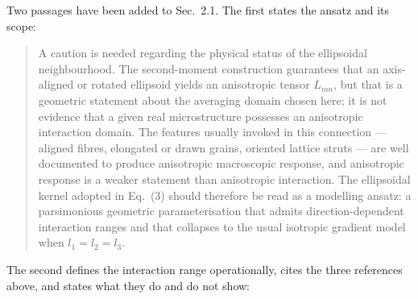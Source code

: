 \documentclass[12pt,a4paper]{article}
\begin{document}
Two passages have been added to Sec.~2.1. The first states the ansatz and its scope:

\begin{quote}\small
A caution is needed regarding the physical status of the
ellipsoidal neighbourhood. The second-moment construction guarantees
that an axis-aligned or rotated ellipsoid yields an anisotropic tensor
$L_{mn}$, but that is a geometric statement about the averaging domain
chosen here; it is not evidence that a given real microstructure
possesses an anisotropic interaction domain. The features usually
invoked in this connection --- aligned fibres, elongated or drawn
grains, oriented lattice struts --- are well documented to produce
anisotropic macroscopic response, and anisotropic response is a weaker
statement than anisotropic interaction. The ellipsoidal kernel adopted
in Eq.~(3) should therefore be read as a
modelling ansatz: a parsimonious geometric parameterisation that admits
direction-dependent interaction ranges and that collapses to the usual
isotropic gradient model when $l_1=l_2=l_3$.
\end{quote}

\noindent The second defines the interaction range operationally, cites the three references above, and states what they do and do not show:
\end{document}
